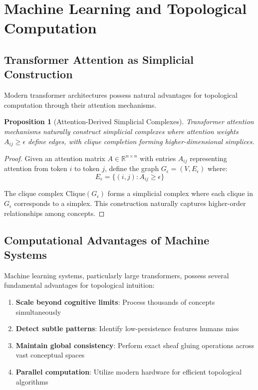\documentclass[11pt]{article}
\newtheorem{proposition}[theorem]{Proposition}
\newcommand{\R}{\mathbb{R}}
\begin{document}
\section{Machine Learning and Topological Computation}

\subsection{Transformer Attention as Simplicial Construction}

Modern transformer architectures possess natural advantages for topological computation through their attention mechanisms.

\begin{proposition}[Attention-Derived Simplicial Complexes]
Transformer attention mechanisms naturally construct simplicial complexes where attention weights $A_{ij} \geq \epsilon$ define edges, with clique completion forming higher-dimensional simplices.
\end{proposition}

\begin{proof}
Given an attention matrix $A \in \R^{n \times n}$ with entries $A_{ij}$ representing attention from token $i$ to token $j$, define the graph $G_\epsilon = (V, E_\epsilon)$ where:
$$E_\epsilon = \{(i,j) : A_{ij} \geq \epsilon\}$$

The clique complex $\text{Clique}(G_\epsilon)$ forms a simplicial complex where each clique in $G_\epsilon$ corresponds to a simplex. This construction naturally captures higher-order relationships among concepts.
\end{proof}

\subsection{Computational Advantages of Machine Systems}

Machine learning systems, particularly large transformers, possess several fundamental advantages for topological intuition:

\begin{enumerate}
\item \textbf{Scale beyond cognitive limits}: Process thousands of concepts simultaneously
\item \textbf{Detect subtle patterns}: Identify low-persistence features humans miss  
\item \textbf{Maintain global consistency}: Perform exact sheaf gluing operations across vast conceptual spaces
\item \textbf{Parallel computation}: Utilize modern hardware for efficient topological algorithms
\end{enumerate}
\end{document}
